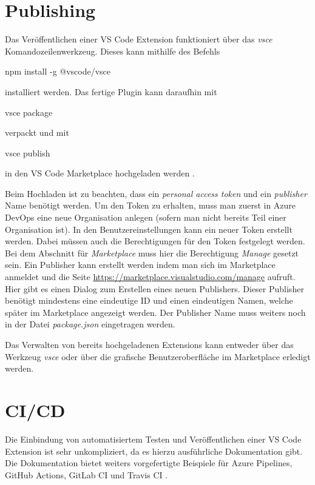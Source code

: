 \section{Publishing}
\label{sec:EntwicklungVsCode_Publishing}

Das Veröffentlichen einer VS Code Extension funktioniert über das 
\emph{vsce} Komandozeilenwerkzeug. Dieses kann mithilfe des Befehls
\begin{GenericCode}[numbers=none]
npm install -g @vscode/vsce
\end{GenericCode}
installiert werden. Das fertige Plugin kann daraufhin mit 
\begin{GenericCode}[numbers=none]
vsce package
\end{GenericCode}
verpackt und mit 
\begin{GenericCode}[numbers=none]
vsce publish
\end{GenericCode}
in den VS Code Marketplace hochgeladen werden \cite{VSCodeExtensionAPIPublishingExtension}.

Beim Hochladen ist zu beachten, dass ein \emph{personal access token}
und ein \emph{publisher} Name benötigt werden.
Um den Token zu erhalten, muss man zuerst in Azure DevOps eine neue Organisation
anlegen (sofern man nicht bereits Teil einer Organisation ist). In den 
Benutzereinstellungen kann ein neuer Token erstellt werden. Dabei müssen auch die 
Berechtigungen für den Token festgelegt werden. Bei dem Abschnitt für 
\emph{Marketplace} muss hier die Berechtigung \emph{Manage} gesetzt sein.
Ein Publisher kann erstellt werden indem man sich im Marketplace anmeldet
und die Seite \url{https://marketplace.visualstudio.com/manage} aufruft.
Hier gibt es einen Dialog zum Erstellen eines neuen Publishers. Dieser
Publisher benötigt mindestens eine eindeutige ID und einen eindeutigen
Namen, welche später im Marketplace angezeigt werden. Der Publisher Name
muss weiters noch in der Datei \emph{package.json} eingetragen werden.

Das Verwalten von bereits hochgeladenen Extensions kann entweder
über das Werkzeug \emph{vsce} oder über die grafische Benutzeroberfläche
im Marketplace erledigt werden.

\section{CI/CD}
\label{sec:EntwicklungVsCode_CICD}

Die Einbindung von automatisiertem Testen und Veröffentlichen
einer VS Code Extension ist sehr unkompliziert, da es hierzu
ausführliche Dokumentation gibt. Die Dokumentation bietet
weiters vorgefertigte Beispiele für Azure Pipelines, 
GitHub Actions, GitLab CI und Travis CI \cite{VSCodeExtensionAPIContinuousIntegration}.

